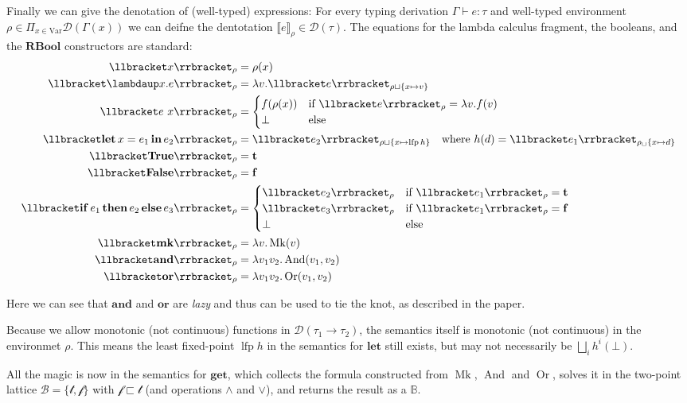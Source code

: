 \documentclass[manuscript,screen,acmsmall,nonacm]{acmart}
\newcommand{\syntax}[1]{\mathbf{#1}}
\newcommand{\Var}{\text{Var}}
\newcommand{\tRBool}{\syntax{RBool}}
\newcommand{\slambda}{\syntax{\lambdaup}}
\newcommand{\sLet}[3]{\syntax{let}\,#1=#2\,\syntax{in}\,#3}
\newcommand{\sTrue}{\syntax{True}}
\newcommand{\sFalse}{\syntax{False}}
\newcommand{\sIf}[3]{\syntax{if}\,#1\,\syntax{then}\,#2\,\syntax{else}\,#3}
\newcommand{\sMk}{\syntax{mk}}
\newcommand{\sGet}{\syntax{get}}
\newcommand{\sAnd}{\syntax{and}}
\newcommand{\sOr}{\syntax{or}}
\newcommand{\dBool}{\mathbb B}
\newcommand{\dFalse}{\mathbf{f}}
\newcommand{\dTrue}{\mathbf{t}}
\newcommand{\rBool}{\mathscr B}
\newcommand{\rTrue}{\mathscr{t}}
\newcommand{\rFalse}{\mathscr{f}}
\newcommand{\lfp}{\operatorname{lfp}}
\newcommand{\dlambda}{\mathit{\lambda}}
\newcommand{\dMk}{\operatorname{Mk}}
\newcommand{\dAnd}{\operatorname{And}}
\newcommand{\dOr}{\operatorname{Or}}
\newcommand{\D}[1]{\llbracket #1 \rrbracket}
\newcommand{\tD}[1]{\mathcal D(#1)}
\begin{document}
Finally we can give the denotation of (well-typed) expressions: For every typing derivation $\Gamma \vdash e \colon \tau$ and well-typed environment $\rho \in \Pi_{x \in \Var} \tD{\Gamma(x)}$ we can deifne the dentotation $\D{e}_\rho \in \tD{\tau}$. The equations for the lambda calculus fragment, the booleans, and the $\tRBool$ constructors are standard:
\begin{align*}
\D{x}_\rho &= \rho(x) \\
\D{\slambda x. e}_\rho &= \dlambda v. \D{e}_{\rho \sqcup \{x \mapsto v\}} \\
\D{e~x}_\rho &=
\begin{cases}
f(\rho(x)) &\text{if } \D{e}_\rho = \dlambda v. f(v) \\
\bot &\text{else}
\end{cases}\\
\D{\sLet{x}{e_1}{e_2}}_\rho &=
\D{e_2}_{\rho \sqcup \{x \mapsto \lfp h \}}
\quad \text{where } h(d)= \D{e_1}_{\rho_\sqcup\{x \mapsto d\}} \\
\D{\sTrue}_\rho &= \dTrue\\
\D{\sFalse}_\rho &= \dFalse\\
\D{\sIf{e_1}{e_2}{e_3}}_\rho &=
\begin{cases}
\D{e_2}_\rho &\text{if } \D{e_1}_\rho = \dTrue \\
\D{e_3}_\rho &\text{if } \D{e_1}_\rho = \dFalse \\
\bot &\text{else}
\end{cases} \\
\D{\sMk}_\rho &= \dlambda v. \dMk(v) \\
\D{\sAnd}_\rho &= \dlambda v_1 v_2. \dAnd(v_1, v_2)\\
\D{\sOr}_\rho &= \dlambda v_1 v_2. \dOr(v_1, v_2)
\end{align*}

Here we can see that $\sAnd$ and $\sOr$ are \emph{lazy} and thus can be used to tie the knot, as described in the paper.

Because we allow monotonic (not continuous) functions in $\tD{\tau_1 \to \tau_2}$, the semantics itself is monotonic (not continuous) in the environmet $\rho$. This means the least fixed-point $\lfp h$ in the semantics for $\syntax{let}$ still exists, but may not necessarily be $\bigsqcup_{i} h^i(\bot)$.

\newcommand{\interp}{\operatorname{\textit{interp}}}
\newcommand{\cost}{\operatorname{\textit{cost}}}

All the magic is now in the semantics for $\sGet$, which collects the formula constructed from $\dMk$, $\dAnd$ and $\dOr$, solves it in the two-point lattice $\rBool = \{ \rTrue, \rFalse \}$ with $\rFalse \sqsubset \rTrue$ (and operations $\wedge$ and $\vee$), and returns the result as a $\dBool$.
\end{document}

